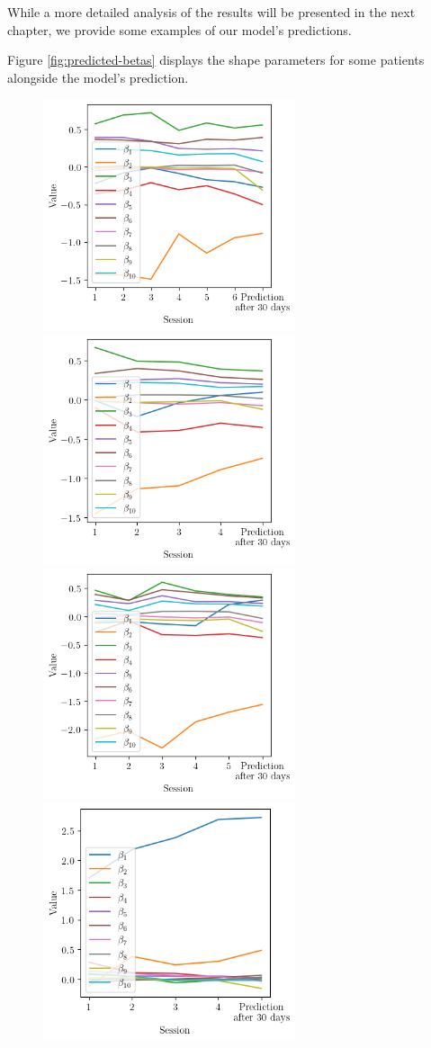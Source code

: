 While a more detailed analysis of the results will be presented in the next
chapter, we provide some examples of our model's predictions.

Figure \ref{fig:predicted-betas} displays the shape parameters for some
patients alongside the model's prediction.

\begin{figure}[h]
	\centering
	\includegraphics[width=210pt]{files/betas_patient_2.png}
	\includegraphics[width=210pt]{files/betas_patient_3.png}
	\includegraphics[width=210pt]{files/betas_patient_8.png}
	\includegraphics[width=210pt]{files/betas_patient_9.png}

\end{figure}
